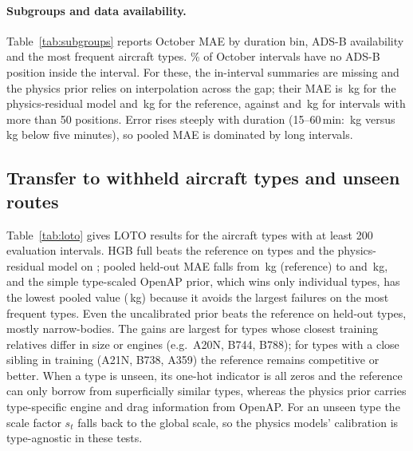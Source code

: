 \documentclass[runningheads]{llncs}
\begin{document}
\begin{table}[t]
\centering
\caption{Refit feature-group ablation of HGB full on October 2025.}
\label{tab:ablation}
\scriptsize

\end{table}

\paragraph{Subgroups and data availability.}
Table~\ref{tab:subgroups} reports October MAE by duration bin, ADS-B availability and the most frequent aircraft types. \zeroAdsbOct{}\% of October intervals have no ADS-B position inside the interval. For these, the in-interval summaries are missing and the physics prior relies on interpolation across the gap; their MAE is \adsbZeroHgbResidualPhysics{}\,kg for the physics-residual model and \adsbZeroHgbMetadataAdsb{}\,kg for the reference, against \adsbManyHgbResidualPhysics{} and \adsbManyHgbMetadataAdsb{}\,kg for intervals with more than 50 positions. Error rises steeply with duration (15--60\,min: \durLongHgbResidualPhysics{}\,kg versus \durShortHgbResidualPhysics{}\,kg below five minutes), so pooled MAE is dominated by long intervals.

\begin{table}[t]
\centering
\caption{October 2025 MAE (kg) by subgroup. ADS-B availability counts positions inside the interval.}
\label{tab:subgroups}
\scriptsize
\setlength{\tabcolsep}{3pt}
\resizebox{\linewidth}{!}{}
\end{table}

\subsection{Transfer to withheld aircraft types and unseen routes}
Table~\ref{tab:loto} gives LOTO results for the \lotoTypes{} aircraft types with at least 200 evaluation intervals. HGB full beats the reference on \lotoWinsHgbFull{} types and the physics-residual model on \lotoWinsHgbResidualPhysics{}; pooled held-out MAE falls from \lotoPooledHgbMetadataAdsb{}\,kg (reference) to \lotoPooledHgbFull{} and \lotoPooledHgbResidualPhysics{}\,kg, and the simple type-scaled OpenAP prior, which wins only \lotoWinsOpenapCalibrated{} individual types, has the lowest pooled value (\lotoPooledOpenapCalibrated{}\,kg) because it avoids the largest failures on the most frequent types. Even the uncalibrated prior beats the reference on \lotoWinsOpenapPhysics{} held-out types, mostly narrow-bodies. The gains are largest for types whose closest training relatives differ in size or engines (e.g.\ A20N, B744, B788); for types with a close sibling in training (A21N, B738, A359) the reference remains competitive or better. When a type is unseen, its one-hot indicator is all zeros and the reference can only borrow from superficially similar types, whereas the physics prior carries type-specific engine and drag information from OpenAP. For an unseen type the scale factor $s_t$ falls back to the global scale, so the physics models' calibration is type-agnostic in these tests.
\end{document}
